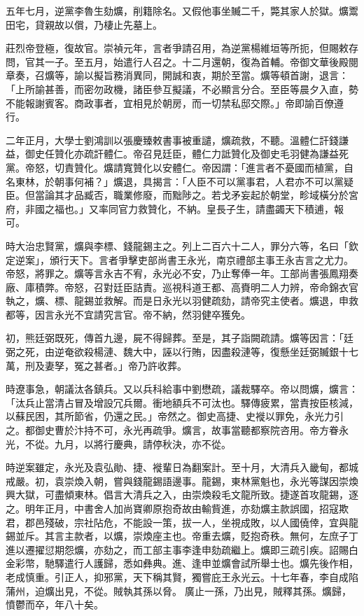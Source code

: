 \begin{pinyinscope}
五年七月，逆黨李魯生劾爌，削籍除名。又假他事坐贓二千，斃其家人於獄。爌鬻田宅，貸親故以償，乃棲止先墓上。

莊烈帝登極，復故官。崇禎元年，言者爭請召用，為逆黨楊維垣等所扼，但賜敕存問，官其一子。至五月，始遣行人召之。十二月還朝，復為首輔。帝御文華後殿閱章奏，召爌等，諭以擬旨務消異同，開誠和衷，期於至當。爌等頓首謝，退言：「上所諭甚善，而密勿政機，諸臣參互擬議，不必顯言分合。至臣等晨夕入直，勢不能報謝賓客。商政事者，宜相見於朝房，而一切禁私邸交際。」帝即諭百僚遵行。

二年正月，大學士劉鴻訓以張慶臻敕書事被重譴，爌疏救，不聽。溫體仁訐錢謙益，御史任贊化亦疏訐體仁。帝召見廷臣，體仁力詆贊化及御史毛羽健為謙益死黨。帝怒，切責贊化。爌請寬贊化以安體仁。帝因謂：「進言者不憂國而植黨，自名東林，於朝事何補？」爌退，具揭言：「人臣不可以黨事君，人君亦不可以黨疑臣。但當論其才品臧否，職業修廢，而黜陟之。若戈矛妄起於朝堂，畛域橫分於宮府，非國之福也。」又率同官力救贊化，不納。皇長子生，請盡蠲天下積逋，報可。

時大治忠賢黨，爌與李標、錢龍錫主之。列上二百六十二人，罪分六等，名曰「欽定逆案」，頒行天下。言者爭擊吏部尚書王永光，南京禮部主事王永吉言之尤力。帝怒，將罪之。爌等言永吉不宥，永光必不安，乃止奪俸一年。工部尚書張鳳翔奏廠、庫積弊。帝怒，召對廷臣詰責。巡視科道王都、高賚明二人力辨，帝命錦衣官執之，爌、標、龍錫並救解。而是日永光以羽健疏劾，請帝究主使者。爌退，申救都等，因言永光不宜請究言官。帝不納，然羽健卒獲免。

初，熊廷弼既死，傳首九邊，屍不得歸葬。至是，其子詣闕疏請。爌等因言：「廷弼之死，由逆奄欲殺楊漣、魏大中，誣以行賄，因盡殺漣等，復懸坐廷弼贓銀十七萬，刑及妻孥，冤之甚者。」帝乃許收葬。

時遼事急，朝議汰各鎮兵。又以兵科給事中劉懋疏，議裁驛卒。帝以問爌，爌言：「汰兵止當清占冒及增設冗兵爾。衝地額兵不可汰也。驛傳疲累，當責按臣核減，以蘇民困，其所節省，仍還之民。」帝然之。御史高捷、史褷以罪免，永光力引之。都御史曹於汴持不可，永光再疏爭。爌言，故事當聽都察院咨用。帝方眷永光，不從。九月，以將行慶典，請停秋決，亦不從。

時逆案雖定，永光及袁弘勛、捷、褷輩日為翻案計。至十月，大清兵入畿甸，都城戒嚴。初，袁崇煥入朝，嘗與錢龍錫語邊事。龍錫，東林黨魁也，永光等謀因崇煥興大獄，可盡傾東林。倡言大清兵之入，由崇煥殺毛文龍所致。捷遂首攻龍錫，逐之。明年正月，中書舍人加尚寶卿原抱奇故由輸貲進，亦劾爌主款誤國，招寇欺君，郡邑殘破，宗社阽危，不能設一策，拔一人，坐視成敗，以人國僥倖，宜與龍錫並斥。其言主款者，以爌，崇煥座主也。帝重去爌，貶抱奇秩。無何，左庶子丁進以遷擢愆期怨爌，亦劾之，而工部主事李逢申劾疏繼上。爌即三疏引疾。詔賜白金彩幣，馳驛遣行人護歸，悉如彝典。進、逢申並爌會試所舉士也。爌先後作相，老成慎重。引正人，抑邪黨，天下稱其賢，獨嘗庇王永光云。十七年春，李自成陷蒲州，迫爌出見，不從。賊執其孫以脅。廣止一孫，乃出見，賊釋其孫。爌歸，憤鬱而卒，年八十矣。


\end{pinyinscope}
